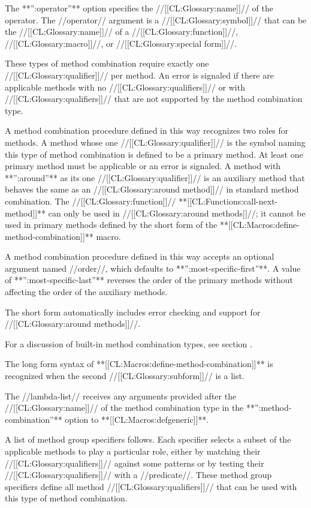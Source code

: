 \itemitem{\bull} The **'':operator''** option specifies the //[[CL:Glossary:name]]// of the operator. The //operator// argument is a //[[CL:Glossary:symbol]]// that can be the //[[CL:Glossary:name]]// of a //[[CL:Glossary:function]]//, //[[CL:Glossary:macro]]//, or //[[CL:Glossary:special form]]//.

\endlist

These types of method combination require exactly one //[[CL:Glossary:qualifier]]// per method. An error is signaled if there are applicable methods with no //[[CL:Glossary:qualifiers]]// or with //[[CL:Glossary:qualifiers]]// that are not supported by the method combination type.

A method combination procedure defined in this way recognizes two roles for methods. A method whose one //[[CL:Glossary:qualifier]]// is the symbol naming this type of method combination is defined to be a primary method. At least one primary method must be applicable or an error is signaled. A method with **'':around''** as its one //[[CL:Glossary:qualifier]]// is an auxiliary method that behaves the same as an //[[CL:Glossary:around method]]// in standard method combination. The //[[CL:Glossary:function]]// **[[CL:Functions:call-next-method]]** can only be used in //[[CL:Glossary:around methods]]//; it cannot be used in primary methods defined by the short form of the **[[CL:Macros:define-method-combination]]** macro.

A method combination procedure defined in this way accepts an optional argument named //order//, which defaults to **'':most-specific-first''**. A value of **'':most-specific-last''** reverses the order of the primary methods without affecting the order of the auxiliary methods.

The short form automatically includes error checking and support for //[[CL:Glossary:around methods]]//.

For a discussion of built-in method combination types, see section {\secref\BuiltInMethCombTypes}.


The long form syntax of **[[CL:Macros:define-method-combination]]** is recognized when the second //[[CL:Glossary:subform]]// is a list.

The //lambda-list// receives any arguments provided after the //[[CL:Glossary:name]]// of the method combination type in the **'':method-combination''** option to **[[CL:Macros:defgeneric]]**.

A list of method group specifiers follows. Each specifier selects a subset of the applicable methods to play a particular role, either by matching their //[[CL:Glossary:qualifiers]]// against some patterns or by testing their //[[CL:Glossary:qualifiers]]// with a //predicate//. These method group specifiers define all method //[[CL:Glossary:qualifiers]]// that can be used with this type of method combination.


